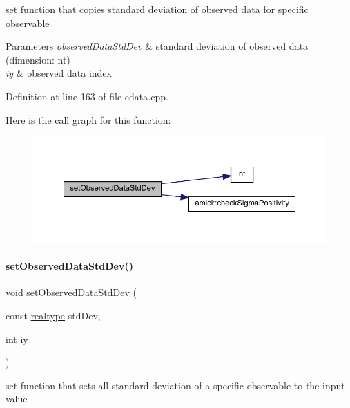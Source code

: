 set function that copies standard deviation of observed data for specific observable


\begin{DoxyParams}{Parameters}
{\em observed\+Data\+Std\+Dev} & standard deviation of observed data (dimension\+: nt) \\
\hline
{\em iy} & observed data index \\
\hline
\end{DoxyParams}


Definition at line 163 of file edata.\+cpp.

Here is the call graph for this function\+:
\nopagebreak
\begin{figure}[H]
\begin{center}
\leavevmode
\includegraphics[width=350pt]{classamici_1_1_exp_data_a90948c75e8ce51cd69be08a92215e6c2_cgraph}
\end{center}
\end{figure}
\mbox{\label{classamici_1_1_exp_data_a10c64e99f5f3a2b19e3944b69b0d69ff}} 
\paragraph{\texorpdfstring{setObservedDataStdDev()}{setObservedDataStdDev()}\hspace{0.1cm}{\footnotesize\ttfamily [4/4]}}
{\footnotesize\ttfamily void set\+Observed\+Data\+Std\+Dev (\begin{DoxyParamCaption}\item[{const \mbox{\hyperlink{namespaceamici_a1bdce28051d6a53868f7ccbf5f2c14a3}{realtype}}}]{std\+Dev,  }\item[{int}]{iy }\end{DoxyParamCaption})}

set function that sets all standard deviation of a specific observable to the input value


